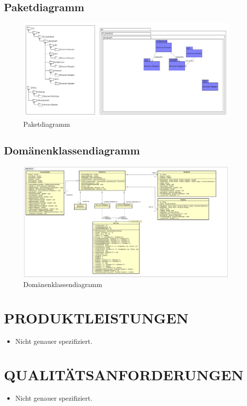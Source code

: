 	\subsection{Paketdiagramm}
		\begin{figure}[H]
			\centering
			\includegraphics[width=0.7\linewidth]{images/Paketdiagramm}
			\caption{Paketdiagramm}
			\label{fig:Paketdiagramm}
		\end{figure}
	\subsection{Domänenklassendiagramm}
		\begin{figure}[H]
			\centering
			\includegraphics[width=0.7\linewidth]{images/DomaenenKlassendiagramm}
			\caption{Domänenklassendiagramm}
			\label{fig:Domänenklassendiagramm}
		\end{figure}
	\section{\Large PRODUKTLEISTUNGEN}
	\begin{itemize}
		\item Nicht genauer spezifiziert.
	\end{itemize} 
		
	
	\section{\Large QUALITÄTSANFORDERUNGEN}
	\begin{itemize}
		\item Nicht genauer spezifiziert.
	\end{itemize}
	
